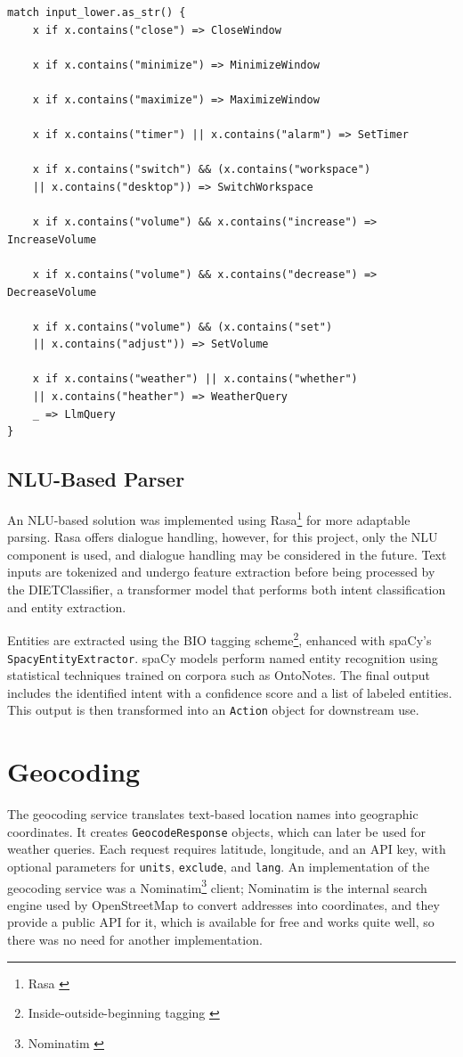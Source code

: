 \begin{verbatim}
match input_lower.as_str() {
    x if x.contains("close") => CloseWindow

    x if x.contains("minimize") => MinimizeWindow

    x if x.contains("maximize") => MaximizeWindow

    x if x.contains("timer") || x.contains("alarm") => SetTimer

    x if x.contains("switch") && (x.contains("workspace")
    || x.contains("desktop")) => SwitchWorkspace

    x if x.contains("volume") && x.contains("increase") => IncreaseVolume

    x if x.contains("volume") && x.contains("decrease") => DecreaseVolume

    x if x.contains("volume") && (x.contains("set")
    || x.contains("adjust")) => SetVolume

    x if x.contains("weather") || x.contains("whether")
    || x.contains("heather") => WeatherQuery
    _ => LlmQuery
}
\end{verbatim}

\subsection{NLU-Based Parser}
An NLU-based solution was implemented using Rasa\footnote{Rasa \cite{rasa}} for more adaptable parsing.
Rasa offers dialogue handling, however, for this project, only the NLU component is used,
and dialogue handling may be considered in the future.
Text inputs are tokenized and undergo feature extraction before being processed by the DIETClassifier,
a transformer model that performs both intent classification and entity extraction.

Entities are extracted using the BIO tagging scheme\footnote{Inside-outside-beginning tagging \cite{bio}},
enhanced with spaCy's \texttt{SpacyEntityExtractor}.
spaCy models perform named entity recognition using statistical techniques trained on corpora such as OntoNotes.
The final output includes the identified intent with a confidence score and a list of labeled entities.
This output is then transformed into an \texttt{Action} object for downstream use.

\section{Geocoding}
The geocoding service translates text-based location names into geographic coordinates.
It creates \texttt{GeocodeResponse} objects, which can later be used for weather queries.
Each request requires latitude, longitude, and an API key, with optional parameters for \texttt{units}, \texttt{exclude}, and \texttt{lang}.
An implementation of the geocoding service was a Nominatim\footnote{Nominatim \cite{nominatim}} client;
Nominatim is the internal search engine used by OpenStreetMap to convert addresses into coordinates,
and they provide a public API for it, which is available for free and works quite well, so there was no need for another implementation.

